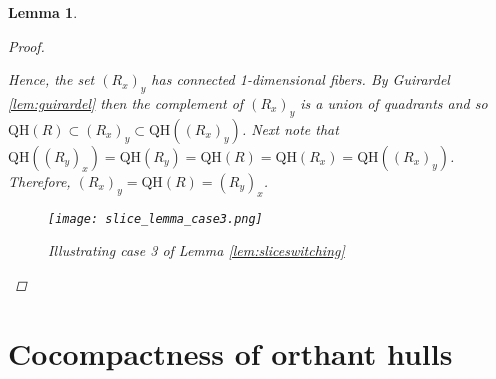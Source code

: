 \documentclass[12pt,parskip=full]{report}
\theoremstyle{plain}
\newtheorem{lem}[thm]{Lemma}
\theoremstyle{definition}
\newcommand{\rxy}{(R_x)_y}
\newcommand{\ryx}{(R_y)_x}
\begin{document}
\begin{lem}
\begin{proof}
\begin{enumerate}
        \end{enumerate}
        Hence, the set $\rxy$ has connected 1-dimensional fibers. By Guirardel \ref{lem:guirardel} then the complement of $\rxy$ is a union of quadrants and so $\text{QH}(R)\subset \rxy\subset \text{QH}(\rxy)$. Next note that $\text{QH}((R_y)_x)=\text{QH}(R_y)=\text{QH}(R)=\text{QH}(R_x)=\text{QH}((R_x)_y)$. Therefore, $\rxy =\text{QH}(R)=\ryx$.
        
        
        
        \begin{figure}[htp]
    \centering
    \texttt{[image: slice\_lemma\_case3.png]}
    \caption{Illustrating case 3 of Lemma \ref{lem:sliceswitching}}
    \label{fig:square}
\end{figure}
        
        
        
                  
    \end{proof}
\end{lem}


\section{Cocompactness of orthant hulls}
\end{document}
